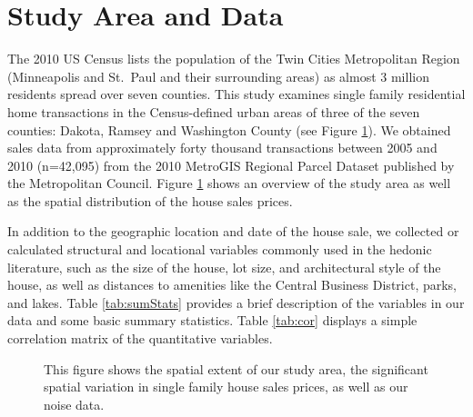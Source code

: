 \documentclass{article}\usepackage{graphicx, color}
\begin{document}
\section{Study Area and Data}
The 2010 US Census lists the population of the Twin Cities Metropolitan Region (Minneapolis and St.\ Paul and their surrounding areas) as almost 3 million residents spread over seven counties. This study examines single family residential home transactions in the Census-defined urban areas of three of the seven counties: Dakota, Ramsey and Washington County (see Figure \ref{fig:overview}). We obtained sales data from approximately forty thousand transactions between 2005 and 2010 (n=42,095) from the 2010 MetroGIS Regional Parcel Dataset published by the Metropolitan Council. Figure \ref{fig:overview} shows an overview of the study area as well as the spatial distribution of the house sales prices. 

In addition to the geographic location and date of the house sale, we collected or calculated structural and locational variables commonly used in the hedonic literature, such as the size of the house, lot size, and architectural style of the house, as well as distances to amenities like the Central Business District, parks, and lakes. Table \ref{tab:sumStats} provides a brief description of the variables in our data and some basic summary statistics. Table \ref{tab:cor} displays a simple correlation matrix of the quantitative variables.

\begin{figure}
\caption{This figure shows the spatial extent of our study area, the significant spatial variation in single family house sales prices, as well as our noise data.}\label{fig:overview}
\end{figure}
\end{document}

